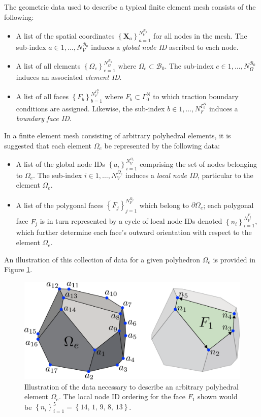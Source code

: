 	The geometric data used to describe a typical finite element mesh consists of the following:
	\begin{itemize}
		\item A list of the spatial coordinates $\left\{ \bm{X}_a \right\}_{a=1}^{N^{\mathcal{B}_0}_V}$ for all nodes in the mesh. The sub-index $a \in 1, \ldots, N^{\mathcal{B}_0}_V$ induces a \textit{global node ID} ascribed to each node.
		\item A list of all elements $\left\{ \Omega_{e} \right\}_{e = 1}^{N^{\mathcal{B}_0}_\Omega}$ where $\Omega_{e} \subset \mathcal{B}_0$. The sub-index $e \in 1, \ldots, N^{\mathcal{B}_0}_\Omega$ induces an associated \textit{element ID}.
		\item A list of all faces $\left\{ F_{b} \right\}_{b = 1}^{N^{\Gamma^{\mathrm N}_0}_F}$ where $F_{b} \subset \Gamma^{\mathrm N}_0$ to which traction boundary conditions are assigned. Likewise, the sub-index $b \in 1, \ldots, N^{\Gamma^{\mathrm N}_0}_F$ induces a \textit{boundary face ID}.
	\end{itemize}
	
	In a finite element mesh consisting of arbitrary polyhedral elements, it is suggested that each element $\Omega_e$ be represented by the following data:
	\begin{itemize}
		\item A list of the global node IDs $\left\{ a_i \right\}_{i=1}^{N^{\Omega_e}_V}$ comprising the set of nodes belonging to $\Omega_e$. The sub-index $i \in 1, \ldots, N^{\Omega_e}_V$ induces a \textit{local node ID}, particular to the element $\Omega_e$.
		\item A list of the polygonal faces $\left\{ F_{j} \right\}_{j=1}^{N^{\Omega_e}_F}$ which belong to $\partial \Omega_e$; each polygonal face $F_j$ is in turn represented by a cycle of local node IDs denoted $\left\{ n_i \right\}_{i=1}^{N^{F_j}_V}$, which further determine each face's outward orientation with respect to the element $\Omega_e$.
	\end{itemize}
	An illustration of this collection of data for a given polyhedron $\Omega_e$ is provided in Figure \ref{fig:polyhedron_data}.
	\begin{figure} [!ht]
		\centering
		\includegraphics[width = 6.0in]{figures/polyhedron_data.pdf}
		\caption{Illustration of the data necessary to describe an arbitrary polyhedral element $\Omega_e$. The local node ID ordering for the face $F_1$ shown would be $\left\{ n_i \right\}_{i=1}^{5} = \left\{ 14, \, 1, \, 9, \, 8, \, 13 \right\}$.}
		\label{fig:polyhedron_data}
	\end{figure}
	
